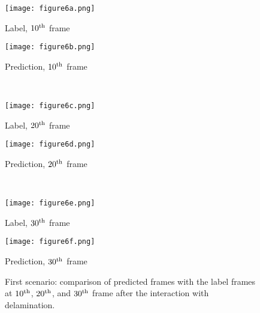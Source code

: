 \documentclass[pdflatex,sn-mathphys-num]{sn-jnl}%
\begin{document}
\begin{figure}
	\centering
	\begin{minipage}[b]{0.44\textwidth}
		\centering
		\texttt{[image: figure6a.png]}
		\caption*{Label, $10\textsuperscript{th}$ frame}
		\label{fig:num_415_label1}
	\end{minipage}
	\hfill
	\begin{minipage}[b]{0.44\textwidth}
		\centering
		\texttt{[image: figure6b.png]}
		\caption*{Prediction, $10\textsuperscript{th}$ frame}
		\label{fig:num_415_pred1}
	\end{minipage}
	\\
	\begin{minipage}[b]{0.44\textwidth}
		\centering
		\texttt{[image: figure6c.png]}
		\caption*{Label, $20\textsuperscript{th}$ frame}
		\label{fig:num_415_label2}
	\end{minipage}
	\hfill
	\begin{minipage}[b]{0.44\textwidth}
		\centering
		\texttt{[image: figure6d.png]}
		\caption*{Prediction, $20\textsuperscript{th}$ frame}
		\label{fig:num_415_pred2}
	\end{minipage}
	\\
	\begin{minipage}[b]{0.44\textwidth}
		\centering
		\texttt{[image: figure6e.png]}
		\caption*{Label, $30\textsuperscript{th}$ frame}
		\label{fig:num_415_label3}
	\end{minipage}
	\hfill
	\begin{minipage}[b]{0.44\textwidth}
		\centering
		\texttt{[image: figure6f.png]}
		\caption*{Prediction, $30\textsuperscript{th}$ frame}
		\label{fig:num_415_pred3}
	\end{minipage}
	\caption{First scenario: comparison of predicted frames with the label 
	frames at $10\textsuperscript{th}$, $20\textsuperscript{th}$, and 
	$30\textsuperscript{th}$ frame after the interaction with delamination.}
	\label{fig:num_415}
\end{figure}
\end{document}
